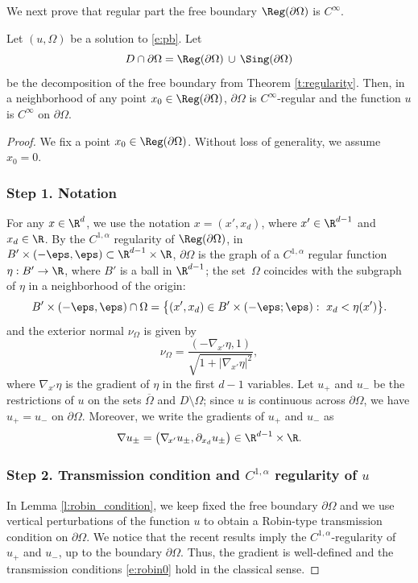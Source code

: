 We next prove that regular part the free boundary $\Reg(\partial\Omega)$ is $C^\infty$.
\begin{teo}\label{t:higher_regularity}
Let $(u,\Omega)$ be a solution to \eqref{e:pb}. Let
\[D\cap\partial\Omega=\Reg(\partial\Omega)\,\cup\,\Sing(\partial\Omega)\]
be the decomposition of the free boundary from Theorem \ref{t:regularity}. Then, in a neighborhood of any point $x_0\in \Reg(\partial\Omega)$, $\partial\Omega$ is $C^{\infty}$-regular and the function $u$ is $C^\infty$ on $\partial\Omega$.
\end{teo}

\pagebreak[2]
\begin{proof}
We fix a point $x_0\in \Reg(\partial\Omega)$. Without loss of generality, we assume $x_0=0$.

\subsubsection*{Step 1. Notation} For any $x\in \R^d$, we use the notation $x=(x',x_d)$, where $x'\in \R^{d-1}$ and $x_d\in\R$. By the $C^{1,\alpha}$ regularity of $\Reg(\partial\Omega)$, in $B'\times(-\eps,\eps)\subset\R^{d-1}\times\R$, $\partial\Omega$ is the graph of a $C^{1,\alpha}$ regular function
$\eta:B'\to\R$, where $B'$ is a ball in $\R^{d-1}$; the set~$\Omega$ coincides with the subgraph of $\eta$ in a neighborhood of the origin:
\[B'\times(-\eps,\eps)\cap \Omega=\big\{(x',x_d)\in B'\times (-\eps;\eps):\ x_d<\eta(x')\big\}.\]
and the exterior normal $\nu_\Omega$ is given by
\begin{equation}\label{e:nu_Omega}
\nu_\Omega=\frac{(-\nabla_{\!x'}\eta,1)}{\sqrt{1+|\nabla_{\!x'}\eta|^2}},
\end{equation}
where $\nabla_{\!x'}\eta$ is the gradient of $\eta$ in the first $d-1$ variables. Let $u_+$ and $u_-$ be the restrictions of $u$ on the sets $\overline\Omega$ and $D\setminus \Omega$; since $u$ is continuous across $\partial\Omega$, we have $u_+=u_-$ on $\partial\Omega$. Moreover, we write the gradients of $u_+$ and $u_-$ as
\[\nabla u_\pm=\big(\nabla_{\!x'}u_{\pm},\partial_{x_d}u_{\pm}\big)\in\R^{d-1}\times\R.\]

\subsubsection*{Step 2. Transmission condition and $C^{1,\alpha}$ regularity of $u$} In Lemma \ref{l:robin_condition}, we keep fixed the free boundary $\partial\Omega$ and we use vertical perturbations of the function $u$ to obtain a Robin-type transmission condition on $\partial\Omega$. We notice that the recent results \cite{css, D} imply the $C^{1,\alpha}$-regularity of $u_+$ and $u_-$, up to the boundary $\partial\Omega$. Thus, the gradient is well-defined and the transmission conditions \eqref{e:robin0} hold in the classical sense.


\end{proof}
